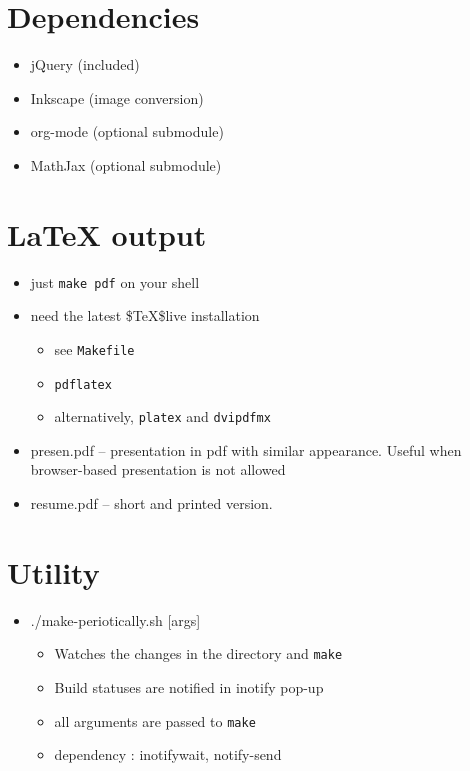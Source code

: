 \section{Dependencies}
\label{sec-8}
\label{dependency}

\begin{itemize}
\item jQuery (included)
\item Inkscape (image conversion)
\item org-mode (optional submodule)
\item MathJax (optional submodule)
\end{itemize}

\section{\LaTeX{} output}
\label{sec-9}

\begin{itemize}
\item just \texttt{make pdf} on your shell
\item need the latest \$\TeX\$live installation
\begin{itemize}
\item see \texttt{Makefile}
\item \texttt{pdflatex}
\item alternatively, \texttt{platex} and \texttt{dvipdfmx}
\end{itemize}
\item presen.pdf -- presentation in pdf with similar appearance. Useful when
browser-based presentation is not allowed
\item resume.pdf -- short and printed version.
\end{itemize}

\section{Utility}
\label{sec-10}

\begin{itemize}
\item ./make-periotically.sh [args]
\begin{itemize}
\item Watches the changes in the directory and \texttt{make}
\item Build statuses are notified in inotify pop-up
\item all arguments are passed to \texttt{make}
\item dependency : inotifywait, notify-send
\end{itemize}
\end{itemize}

